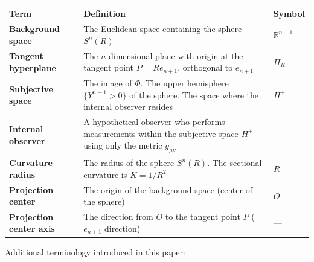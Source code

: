 \documentclass[a4paper,11pt]{article}
\theoremstyle{definition}
\begin{document}
{\def\LTcaptype{table} %
\begin{longtable}[]{@{}
  >{\raggedright\arraybackslash}p{}
  >{\raggedright\arraybackslash}p{}
  >{\raggedright\arraybackslash}p{}@{}}
\toprule\noalign{}
\begin{minipage}[b]{\linewidth}\raggedright
Term
\end{minipage} & \begin{minipage}[b]{\linewidth}\raggedright
Definition
\end{minipage} & \begin{minipage}[b]{\linewidth}\raggedright
Symbol
\end{minipage} \\
\midrule\noalign{}
\endhead
\bottomrule\noalign{}
\endlastfoot
\textbf{Background space} & The Euclidean space containing the sphere \(S^n(R)\) & \(\mathbb{R}^{n+1}\) \\
\textbf{Tangent hyperplane} & The \(n\)-dimensional plane with origin at the tangent point \(P = Re_{n+1}\), orthogonal to \(e_{n+1}\) & \(\Pi_R\) \\
\textbf{Subjective space} & The image of \(\Phi\). The upper hemisphere \(\{Y^{n+1} > 0\}\) of the sphere. The space where the internal observer resides & \(H^+\) \\
\textbf{Internal observer} & A hypothetical observer who performs measurements within the subjective space \(H^+\) using only the metric \(g_{\mu\nu}\) & --- \\
\textbf{Curvature radius} & The radius of the sphere \(S^n(R)\). The sectional curvature is \(K = 1/R^2\) & \(R\) \\
\textbf{Projection center} & The origin of the background space (center of the sphere) & \(O\) \\
\textbf{Projection center axis} & The direction from \(O\) to the tangent point \(P\) (\(e_{n+1}\) direction) & --- \\
\end{longtable}
}

Additional terminology introduced in this paper:
\end{document}

